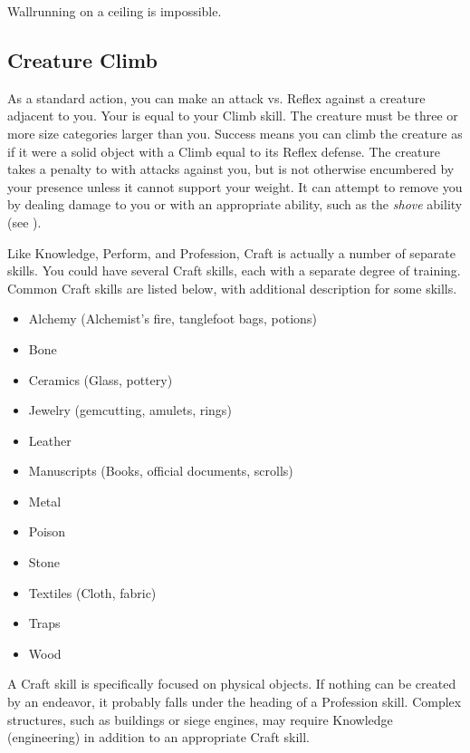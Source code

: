         Wallrunning on a ceiling is impossible.

    \subsection{Creature Climb}
        As a standard action, you can make an attack vs. Reflex against a creature adjacent to you.
        Your  is equal to your Climb skill.
        The creature must be three or more size categories larger than you.
        Success means you can climb the creature as if it were a solid object with a Climb  equal to its Reflex defense.
        The creature takes a  penalty to  with  attacks against you, but is not otherwise encumbered by your presence unless it cannot support your weight.
        It can attempt to remove you by dealing damage to you or with an appropriate ability, such as the \textit{shove} ability (see ).

\newpage
{}
    Like Knowledge, Perform, and Profession, Craft is actually a number of separate skills.
    You could have several Craft skills, each with a separate degree of training.
    Common Craft skills are listed below, with additional description for some skills.

    \begin{itemize}
        \item Alchemy (Alchemist's fire, tanglefoot bags, potions)
        \item Bone
        \item Ceramics (Glass, pottery)
        \item Jewelry (gemcutting, amulets, rings)
        \item Leather
        \item Manuscripts (Books, official documents, scrolls)
        \item Metal
        \item Poison
        \item Stone
        \item Textiles (Cloth, fabric)
        \item Traps
        \item Wood
    \end{itemize}


    A Craft skill is specifically focused on physical objects. If nothing can be created by an endeavor, it probably falls under the heading of a Profession skill. Complex structures, such as buildings or siege engines, may require Knowledge (engineering) in addition to an appropriate Craft skill.

